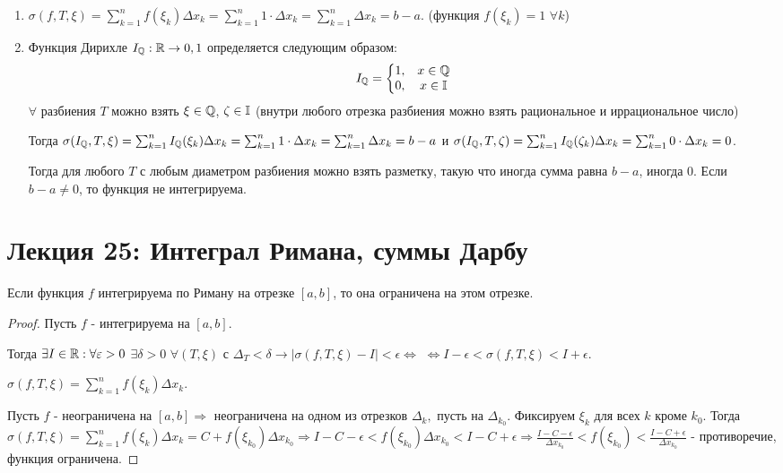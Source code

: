 	\begin{explanation}
		\begin{enumerate}
			\item $\sigma(f, T, \xi) = \sum^{n}_{k = 1} f(\xi_k) \Delta x_k = \sum^{n}_{k = 1} 1 \cdot \Delta x_k = \sum^{n}_{k = 1} \Delta x_k = b - a.$ (функция $f(\xi_k) = 1$ $\forall k$)
			
			\item Функция Дирихле $I_{\mathbb Q} : \mathbb R \rightarrow {0, 1}$ определяется следующим образом:
			\[\displaystyle I_{\mathbb Q} = \left\{{
				\begin{matrix}
					1, & x \in \mathbb Q \\
					0, & x \in \mathbb I
				\end{matrix}
			}\right.\]
			$\forall$ разбиения $T$ можно взять $\xi \in \mathbb Q$, $\zeta \in \mathbb I$ (внутри любого отрезка разбиения можно взять рациональное и иррациональное число)
			
			Тогда $\sigma(I_{\mathbb Q}, T, \xi) = \sum^{n}_{k = 1} I_{\mathbb Q}(\xi_k) \Delta x_k = \sum^{n}_{k = 1} 1 \cdot \Delta x_k = \sum^{n}_{k = 1} \Delta x_k = b - a$ и $\sigma(I_{\mathbb Q}, T, \zeta) = \sum^{n}_{k = 1} I_{\mathbb Q}(\zeta_k) \Delta x_k = \sum^{n}_{k = 1} 0 \cdot \Delta x_k = 0$.
			
			Тогда для любого $T$ с любым диаметром разбиения можно взять разметку, такую что иногда сумма равна $b - a$, иногда 0. Если $b - a \neq 0$, то функция не интегрируема.
		\end{enumerate}	
	\end{explanation}
    
    \section*{Лекция 25: Интеграл Римана, суммы Дарбу}
    
    \begin{sentence}
    	Если функция $f$ интегрируема по Риману на отрезке $[a, b]$, то она ограничена на этом отрезке.
    \end{sentence}
    
    \begin{proof}
    	Пусть $f$ - интегрируема на $[a, b]$. 
    	
    	Тогда $\exists I \in \mathbb R : \forall \varepsilon > 0$ $\exists \delta > 0$  $\forall (T, \xi)$ с $\Delta_T < \delta \rightarrow |\sigma(f, T, \xi) - I| < \epsilon \Leftrightarrow$ $\Leftrightarrow I - \epsilon < \sigma(f, T, \xi) < I + \epsilon$.
    	
    	$\sigma(f, T, \xi) = \sum^{n}_{k = 1} f(\xi_k) \Delta x_k.$
    	
    	Пусть $f$ - неограничена на $[a, b] \Rightarrow$ неограничена на одном из отрезков $\Delta_k,$ пусть на $\Delta_{k_0}$. Фиксируем $\xi_k$ для всех $k$ кроме $k_0$. Тогда $\sigma(f, T, \xi) = \sum^{n}_{k = 1} f(\xi_k) \Delta x_k = C + f(\xi_{k_0}) \Delta x_{k_0} \Rightarrow I - C - \epsilon < f(\xi_{k_0}) \Delta x_{k_0} < I - C + \epsilon \Rightarrow \frac{I - C - \epsilon}{\Delta x_{k_0}} < f(\xi_{k_0}) < \frac{I - C + \epsilon}{\Delta x_{k_0}}$ - противоречие, функция ограничена.
    \end{proof}
    
